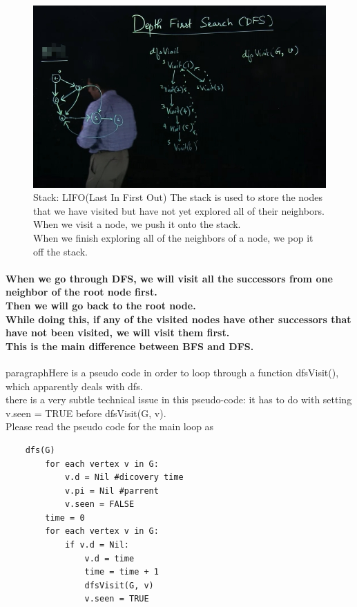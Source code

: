 \documentclass{article}
\begin{document}
\begin{figure}[H]
    \includegraphics[width=\textwidth]{depthfirstsearch.png}
    \caption{Stack: LIFO(Last In First Out)
        The stack is used to store the nodes that we have visited but have not yet explored all of their neighbors.\\
        When we visit a node, we push it onto the stack.\\
        When we finish exploring all of the neighbors of a node, we pop it off the stack.\\    
    }
\end{figure}

\paragraph{
    When we go through DFS, we will visit all the successors from one neighbor of the root node first.\\
    Then we will go back to the root node.\\
    While doing this, if any of the visited nodes have other successors that have not been visited, we will visit them first.\\
    This is the main difference between BFS and DFS.\\
}

paragraph{Here is a pseudo code in order to loop through a function dfsVisit(), which apparently deals with dfs.\\
    there is a very subtle technical issue in this pseudo-code: it has to do with setting v.seen = TRUE before dfsVisit(G, v). \\
    Please read the pseudo code for the main loop as }


\begin{verbatim}
    dfs(G)
        for each vertex v in G:
            v.d = Nil #dicovery time
            v.pi = Nil #parrent
            v.seen = FALSE
        time = 0
        for each vertex v in G:
            if v.d = Nil:
                v.d = time
                time = time + 1
                dfsVisit(G, v)
                v.seen = TRUE
\end{verbatim}
\end{document}
